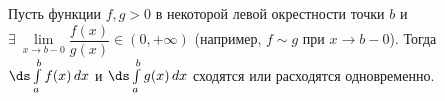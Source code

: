 
    Пусть функции $f,g>0$  в некоторой левой окрестности точки $b$ и $\exists\ \lim\limits_{x\to b-0}\dfrac{f(x)}{g(x)}\in(0,+\infty)$ (например, $f\sim g$ при $x\to b-0$). Тогда
    $\ds\int\limits_{a}^bf(x)\,dx$ и $\ds\int\limits_a^bg(x)\,dx$ сходятся или расходятся одновременно.
    